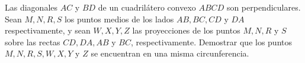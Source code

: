 Las diagonales $AC$ y $BD$ de un cuadrilátero convexo $ABCD$ son perpendiculares. Sean $M,N,R,S$ los puntos medios de los lados $AB,BC,CD$ y $DA$ respectivamente, y sean $W,X,Y,Z$ las proyecciones de los puntos $M,N,R$ y $S$ sobre las rectas $CD,DA,AB$ y $BC$, respectivamente. Demostrar que los puntos $M,N,R,S,W,X,Y$ y $Z$ se encuentran en una misma circunferencia. 

